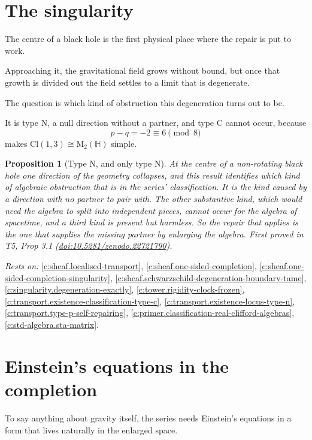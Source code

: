 \documentclass[11pt]{article}
\newtheorem{proposition}[theorem]{Proposition}
\theoremstyle{definition}
\theoremstyle{plain}
\providecommand{\Cl}{}\renewcommand{\Cl}{\mathrm{Cl}}
\providecommand{\HH}{}\renewcommand{\HH}{\mathbb{H}}
\providecommand{\Mat}{}\renewcommand{\Mat}{\mathrm{M}}
\begin{document}
\section{The singularity}

The centre of a black hole is the first physical place where the repair is put to work.

Approaching it, the gravitational field grows without bound, but once that growth is divided out the field settles to a limit that is degenerate.

The question is which kind of obstruction this degeneration turns out to be.

It is type N, a null direction without a partner, and type C cannot occur, because \[ p - q = -2 \equiv 6 \pmod 8 \] makes $\Cl(1,3) \cong \Mat_2(\HH)$ simple.

\begin{proposition}[Type N, and only type N]\label{c:singularity.type-n-only-type-n}
At the centre of a non-rotating black hole one direction of the geometry collapses, and this result identifies which kind of algebraic obstruction that is in the series' classification. It is the kind caused by a direction with no partner to pair with. The other substantive kind, which would need the algebra to split into independent pieces, cannot occur for the algebra of spacetime, and a third kind is present but harmless. So the repair that applies is the one that supplies the missing partner by enlarging the algebra.
\emph{First proved in} T5, Prop 3.1 (\href{https://doi.org/10.5281/zenodo.22721790}{doi:10.5281/zenodo.22721790}).
\end{proposition}
\noindent\emph{Rests on:} \ref{c:sheaf.localised-transport}, \ref{c:sheaf.one-sided-completion}, \ref{c:sheaf.one-sided-completion-singularity}, \ref{c:sheaf.schwarzschild-degeneration-boundary-tame}, \ref{c:singularity.degeneration-exactly}, \ref{c:tower.rigidity-clock-frozen}, \ref{c:transport.existence-classification-type-c}, \ref{c:transport.existence-locus-type-n}, \ref{c:transport.type-p-self-repairing}, \ref{c:primer.classification-real-clifford-algebras}, \ref{c:std-algebra.sta-matrix}.

\section{Einstein's equations in the completion}

To say anything about gravity itself, the series needs Einstein's equations in a form that lives naturally in the enlarged space.
\end{document}
